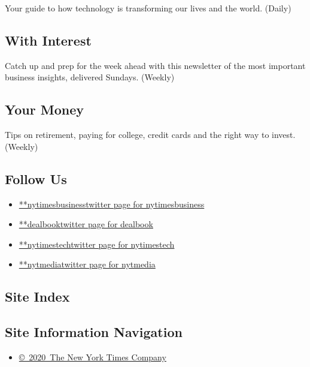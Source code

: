 Your guide to how technology is transforming our lives and the world.
(Daily)

\hypertarget{with-interest}{%
\subsection{With Interest}\label{with-interest}}

Catch up and prep for the week ahead with this newsletter of the most
important business insights, delivered Sundays. (Weekly)

\hypertarget{your-money}{%
\subsection{Your Money}\label{your-money}}

Tips on retirement, paying for college, credit cards and the right way
to invest. (Weekly)

\hypertarget{follow-us}{%
\subsection{Follow Us}\label{follow-us}}

\begin{itemize}
\tightlist
\item
  \href{https://twitter.com/nytimesbusiness}{**nytimesbusinesstwitter
  page for nytimesbusiness}
\item
  \href{https://twitter.com/dealbook}{**dealbooktwitter page for
  dealbook}
\item
  \href{https://twitter.com/nytimestech}{**nytimestechtwitter page for
  nytimestech}
\item
  \href{https://twitter.com/nytmedia}{**nytmediatwitter page for
  nytmedia}
\end{itemize}

\hypertarget{site-index}{%
\subsection{Site Index}\label{site-index}}

\hypertarget{site-information-navigation}{%
\subsection{Site Information
Navigation}\label{site-information-navigation}}

\begin{itemize}
\tightlist
\item
  \href{https://help.nytimes.com/hc/en-us/articles/115014792127-Copyright-notice}{©~2020~The
  New York Times Company}
\end{itemize}

